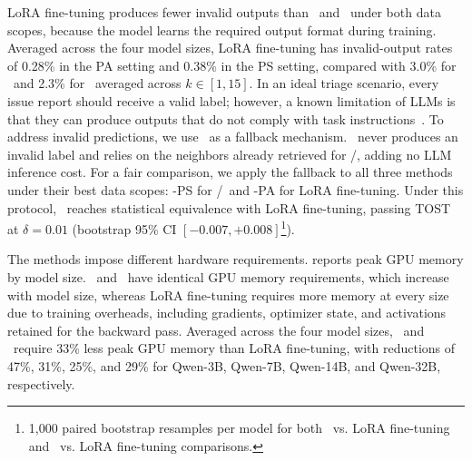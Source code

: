 LoRA fine-tuning produces fewer invalid outputs than \ragtag\ and \bragtag\ under both data scopes, because the model learns the required output format during training. Averaged across the four model sizes, LoRA fine-tuning has invalid-output rates of 0.28\% in the PA setting and 0.38\% in the PS setting, compared with 3.0\% for \ragtag\ and 2.3\% for \bragtag\ averaged across $k \in [1,15]$. In an ideal triage scenario, every issue report should receive a valid label; however, a known limitation of LLMs is that they can produce outputs that do not comply with task instructions~\cite{sclar2023quantifying, akhavan2026linkanchorautonomousllmbasedagent}. To address invalid predictions, we use \votag\ as a fallback mechanism. \votag\ never produces an invalid label and relies on the neighbors already retrieved for \ragtag/\bragtag, adding no LLM inference cost. For a fair comparison, we apply the fallback to all three methods under their best data scopes: \votag-PS for \ragtag/\bragtag\ and \votag-PA for LoRA fine-tuning. Under this protocol, \bragtag\ reaches statistical equivalence with LoRA fine-tuning, passing TOST at $\delta{=}0.01$ (bootstrap 95\% CI $[-0.007, +0.008]$\footnote{1{,}000 paired bootstrap resamples per model for both \ragtag\ vs. LoRA fine-tuning and \bragtag\ vs. LoRA fine-tuning comparisons.}).



The methods impose different hardware requirements.  reports peak GPU memory by model size. \ragtag\ and \bragtag\ have identical GPU memory requirements, which increase with model size, whereas LoRA fine-tuning requires more memory at every size due to training overheads, including gradients, optimizer state, and activations retained for the backward pass. Averaged across the four model sizes, \ragtag\ and \bragtag\ require 33\% less peak GPU memory than LoRA fine-tuning, with reductions of 47\%, 31\%, 25\%, and 29\% for Qwen-3B, Qwen-7B, Qwen-14B, and Qwen-32B, respectively.


